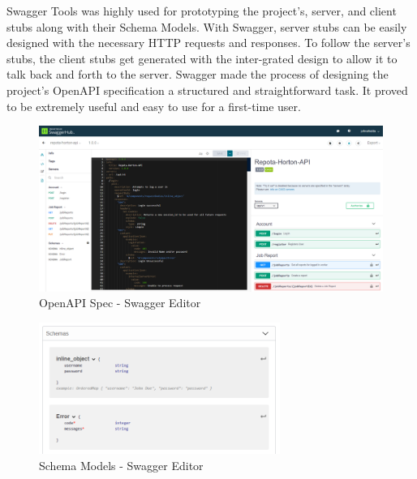 Swagger Tools was highly used for prototyping the project's, server, and client stubs along with their Schema Models. With Swagger, server stubs can be easily designed with the necessary HTTP requests and responses. To follow the server's stubs, the client stubs get generated with the inter-grated design to allow it to talk back and forth to the server. Swagger made the process of designing the project's OpenAPI specification a structured and straightforward task. It proved to be extremely useful and easy to use for a first-time user.

\begin{figure}[H]
    \caption{OpenAPI Spec - Swagger Editor}
    \label{image:swaggerEditor}
    \centering
    \includegraphics[width=1.0\textwidth]{images/misc/openapi.png}
\end{figure}

\begin{figure}[H]
    \caption{Schema Models - Swagger Editor}
    \label{image:swaggerSchemas}
    \centering
    \includegraphics[width=0.7\textwidth]{images/misc/swagger-schemas.png}
\end{figure}

